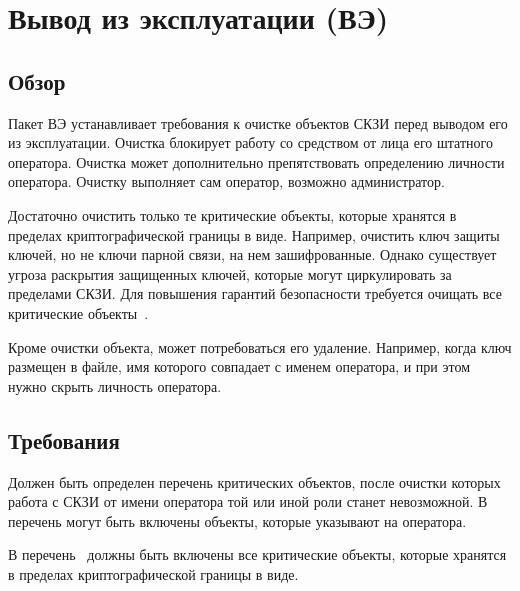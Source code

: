 \section{Вывод из эксплуатации (ВЭ)}\label{DE}

\subsection{Обзор}\label{DE.Intro}

Пакет ВЭ устанавливает требования к очистке объектов СКЗИ перед
выводом его из эксплуатации. Очистка блокирует работу со средством от  
лица его штатного оператора. Очистка может дополнительно препятствовать 
определению личности оператора. Очистку выполняет сам оператор,
возможно администратор.

Достаточно очистить только те критические объекты, которые хранятся в 
пределах криптографической границы в  виде.
%
Например, очистить ключ защиты ключей, но не ключи парной связи, на нем 
зашифрованные.
%
Однако существует угроза раскрытия защищенных ключей, которые могут 
циркулировать за пределами СКЗИ. Для повышения гарантий безопасности требуется 
очищать все критические объекты~.

Кроме очистки объекта, может потребоваться его удаление. Например, когда ключ 
размещен в файле, имя которого совпадает с именем оператора, и при этом нужно 
скрыть личность оператора.


\subsection{Требования}\label{DE.Reqs}

\label{R.DE.List}
Должен быть определен перечень критических объектов, 
после очистки которых работа с СКЗИ от имени оператора
той или иной роли станет невозможной. 
%
В перечень могут быть включены объекты, которые указывают на оператора.

\label{R.DE.Short}
В перечень~ должны быть включены все критические объекты, 
которые хранятся в пределах криптографической границы в 
 виде. 


